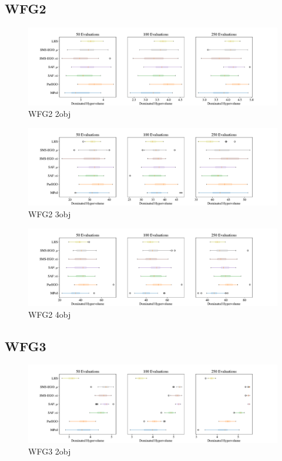 \documentclass[
dvipsnames, table,   %
format=acmsmall,     %
anonymous=true,      %
authorversion=false, %
]{acmart}
\begin{document}
\subsection{WFG2}
\begin{figure}[h]
    \centering
    \includegraphics[width=\textwidth]{figures/wfg2_2obj_6dim_hv_boxplot.pdf}
    \caption{WFG2 2obj}
    \label{fig:boxplot WFG2_2obj_6dim}
\end{figure}

\begin{figure}[h]
    \centering
    \includegraphics[width=\textwidth]{figures/wfg2_3obj_6dim_hv_boxplot.pdf}
    \caption{WFG2 3obj}
    \label{fig:boxplot WFG2_3obj_6dim}
\end{figure}

\begin{figure}[h]
    \centering
    \includegraphics[width=\textwidth]{figures/wfg2_4obj_10dim_hv_boxplot.pdf}
    \caption{WFG2 4obj}
    \label{fig:boxplot WFG2_4obj_10dim}
\end{figure}
\clearpage

\subsection{WFG3}
\begin{figure}[h]
    \centering
    \includegraphics[width=\textwidth]{figures/wfg3_2obj_6dim_hv_boxplot.pdf}
    \caption{WFG3 2obj}
    \label{fig:boxplot WFG3_2obj_6dim}
\end{figure}
\end{document}
